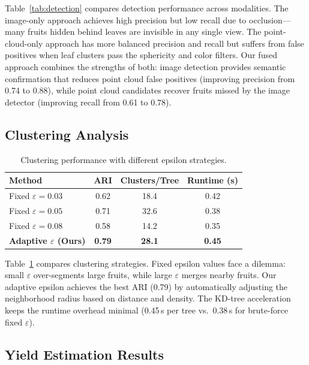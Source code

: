 \documentclass[article,final]{iclr2024_conference}
\begin{document}
Table~\ref{tab:detection} compares detection performance across modalities. The image-only approach achieves high precision but low recall due to occlusion---many fruits hidden behind leaves are invisible in any single view. The point-cloud-only approach has more balanced precision and recall but suffers from false positives when leaf clusters pass the sphericity and color filters. Our fused approach combines the strengths of both: image detection provides semantic confirmation that reduces point cloud false positives (improving precision from 0.74 to 0.88), while point cloud candidates recover fruits missed by the image detector (improving recall from 0.61 to 0.78).

\subsection{Clustering Analysis}

\begin{table}[t]
\centering
\caption{Clustering performance with different epsilon strategies.}
\label{tab:clustering}
\begin{tabular}{lccc}
\toprule
Method & ARI & Clusters/Tree & Runtime (s) \\
\midrule
Fixed $\varepsilon = 0.03$ & 0.62 & 18.4 & 0.42 \\
Fixed $\varepsilon = 0.05$ & 0.71 & 32.6 & 0.38 \\
Fixed $\varepsilon = 0.08$ & 0.58 & 14.2 & 0.35 \\
\textbf{Adaptive $\varepsilon$ (Ours)} & \textbf{0.79} & \textbf{28.1} & \textbf{0.45} \\
\bottomrule
\end{tabular}
\end{table}

Table~\ref{tab:clustering} compares clustering strategies. Fixed epsilon values face a dilemma: small $\varepsilon$ over-segments large fruits, while large $\varepsilon$ merges nearby fruits. Our adaptive epsilon achieves the best ARI (0.79) by automatically adjusting the neighborhood radius based on distance and density. The KD-tree acceleration keeps the runtime overhead minimal (0.45\,s per tree vs.\ 0.38\,s for brute-force fixed $\varepsilon$).

\subsection{Yield Estimation Results}
\end{document}
